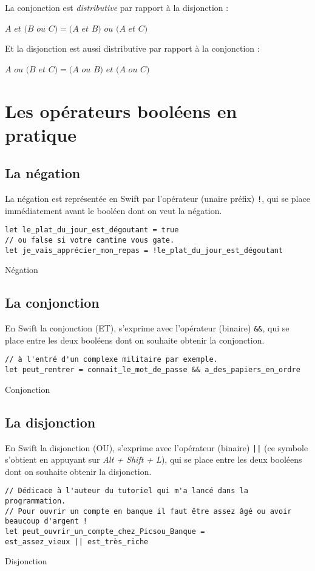La conjonction est \emph{distributive} par rapport à la disjonction :

$A$ $et$ $(B$ $ou$ $C) = (A$ $et$ $B)$ $ou$ $(A$ $et$ $C)$

Et la disjonction est aussi distributive par rapport à la conjonction :

$A$ $ou$ $(B$ $et$ $C) = (A$ $ou$ $B)$ $et$ $(A$ $ou$ $C)$

\section{Les opérateurs booléens en pratique}
\subsection{La négation}
La négation est représentée en Swift par l'opérateur (unaire préfix) \verb"!", qui se place immédiatement avant le booléen dont on veut la négation.
\begin{listing}[h]
\begin{verbatim}
let le_plat_du_jour_est_dégoutant = true
// ou false si votre cantine vous gate.
let je_vais_apprécier_mon_repas = !le_plat_du_jour_est_dégoutant
\end{verbatim}
\caption{Négation}
\end{listing}
\subsection{La conjonction}
En Swift la conjonction (ET), s'exprime avec l'opérateur (binaire) \verb"&&", qui se place entre les deux booléens dont on souhaite obtenir la conjonction.

\begin{listing}[h]
\begin{verbatim}
// à l'entré d'un complexe militaire par exemple.
let peut_rentrer = connait_le_mot_de_passe && a_des_papiers_en_ordre
\end{verbatim}
\caption{Conjonction}
\end{listing}
\subsection{La disjonction}
En Swift la disjonction (OU), s'exprime avec l'opérateur (binaire) \verb"||" (ce symbole s'obtient en appuyant sur \emph{Alt + Shift + L}), qui se place entre les deux booléens dont on souhaite obtenir la disjonction.

\begin{listing}[h]
\begin{verbatim}
// Dédicace à l'auteur du tutoriel qui m'a lancé dans la programmation.
// Pour ouvrir un compte en banque il faut être assez âgé ou avoir beaucoup d'argent !
let peut_ouvrir_un_compte_chez_Picsou_Banque = 
est_assez_vieux || est_très_riche
\end{verbatim}
\caption{Disjonction}
\end{listing}

